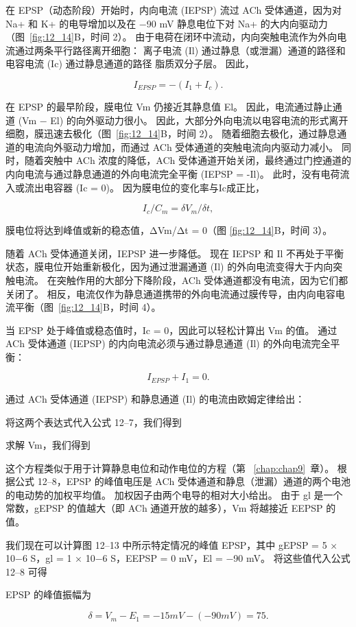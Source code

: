 在 EPSP（动态阶段）开始时，内向电流 (IEPSP) 流过 ACh 受体通道，因为对 Na+ 和 K+ 的电导增加以及在 −90 mV 静息电位下对 Na+ 的大内向驱动力 （图~\ref{fig:12_14}B，时间 2）。
由于电荷在闭环中流动，内向突触电流作为外向电流通过两条平行路径离开细胞：
离子电流 (Il) 通过静息（或泄漏）通道的路径和电容电流 (Ic) 通过静息通道的路径 脂质双分子层。
因此，


\begin{equation}\label{ionic_current}
	I_{EPSP} = -(I_1 + I_c).
\end{equation}

在 EPSP 的最早阶段，膜电位 Vm 仍接近其静息值 El。
因此，电流通过静止通道 (Vm − El) 的向外驱动力很小。
因此，大部分外向电流以电容电流的形式离开细胞，膜迅速去极化（图~\ref{fig:12_14}B，时间 2）。 
随着细胞去极化，通过静息通道的电流向外驱动力增加，而通过 ACh 受体通道的突触电流向内驱动力减小。
同时，随着突触中 ACh 浓度的降低，ACh 受体通道开始关闭，最终通过门控通道的内向电流与通过静息通道的外向电流完全平衡 (IEPSP = -Il)。
此时，没有电荷流入或流出电容器 (Ic = 0)。
因为膜电位的变化率与Ic成正比，


\begin{equation}\label{rate_potential}
	I_c / C_m = \delta V_m / \delta t,
\end{equation}

膜电位将达到峰值或新的稳态值，ΔVm/Δt = 0（图 \ref{fig:12_14}B，时间 3）。


随着 ACh 受体通道关闭，IEPSP 进一步降低。
现在 IEPSP 和 Il 不再处于平衡状态，膜电位开始重新极化，因为通过泄漏通道 (Il) 的外向电流变得大于内向突触电流。
在突触作用的大部分下降阶段，ACh 受体通道都没有电流，因为它们都关闭了。
相反，电流仅作为静息通道携带的外向电流通过膜传导，由内向电容电流平衡（图~\ref{fig:12_14}B，时间 4）。


当 EPSP 处于峰值或稳态值时，Ic = 0，因此可以轻松计算出 Vm 的值。
通过 ACh 受体通道 (IEPSP) 的内向电流必须与通过静息通道 (Il) 的外向电流完全平衡：


\begin{equation}\label{outward_current}
	I_{EPSP} + I_1 = 0.
\end{equation}


通过 ACh 受体通道 (IEPSP) 和静息通道 (Il) 的电流由欧姆定律给出：

将这两个表达式代入公式 12–7，我们得到

求解 Vm，我们得到

这个方程类似于用于计算静息电位和动作电位的方程（第 ~\ref{chap:chap9}~章）。
根据公式 12–8，EPSP 的峰值电压是 ACh 受体通道和静息（泄漏）通道的两个电池的电动势的加权平均值。 
加权因子由两个电导的相对大小给出。
由于 gl 是一个常数，gEPSP 的值越大（即 ACh 通道开放的越多），Vm 将越接近 EEPSP 的值。


我们现在可以计算图 12–13 中所示特定情况的峰值 EPSP，其中 gEPSP = 5 × 10−6 S，gl = 1 × 10−6 S，EEPSP = 0 mV，El = −90 mV。
将这些值代入公式 12–8 可得


EPSP 的峰值振幅为

\begin{equation}\label{peak_amplitude}
	\delta = V_m - E_1 = -15mV - (-90mV) = 75.
\end{equation}


